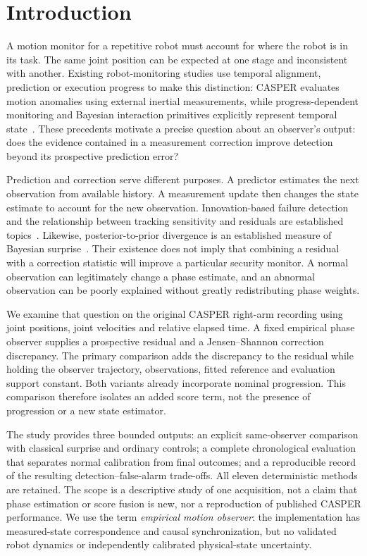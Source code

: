 \section{Introduction}
\label{sec:intro}
A motion monitor for a repetitive robot must account for where the robot is in its task. The same joint position can be expected at one stage and inconsistent with another. Existing robot-monitoring studies use temporal alignment, prediction or execution progress to make this distinction: CASPER evaluates motion anomalies using external inertial measurements, while progress-dependent monitoring and Bayesian interaction primitives explicitly represent temporal state~\cite{casper2024,park2016,campbell2017}. These precedents motivate a precise question about an observer's output: does the evidence contained in a measurement correction improve detection beyond its prospective prediction error?

Prediction and correction serve different purposes. A predictor estimates the next observation from available history. A measurement update then changes the state estimate to account for the new observation. Innovation-based failure detection and the relationship between tracking sensitivity and residuals are established topics~\cite{willsky1976}. Likewise, posterior-to-prior divergence is an established measure of Bayesian surprise~\cite{itti2005}. Their existence does not imply that combining a residual with a correction statistic will improve a particular security monitor. A normal observation can legitimately change a phase estimate, and an abnormal observation can be poorly explained without greatly redistributing phase weights.

We examine that question on the original CASPER right-arm recording using joint positions, joint velocities and relative elapsed time. A fixed empirical phase observer supplies a prospective residual and a Jensen--Shannon correction discrepancy. The primary comparison adds the discrepancy to the residual while holding the observer trajectory, observations, fitted reference and evaluation support constant. Both variants already incorporate nominal progression. This comparison therefore isolates an added score term, not the presence of progression or a new state estimator.

The study provides three bounded outputs: an explicit same-observer comparison with classical surprise and ordinary controls; a complete chronological evaluation that separates normal calibration from final outcomes; and a reproducible record of the resulting detection--false-alarm trade-offs. All eleven deterministic methods are retained. The scope is a descriptive study of one acquisition, not a claim that phase estimation or score fusion is new, nor a reproduction of published CASPER performance. We use the term \emph{empirical motion observer}: the implementation has measured-state correspondence and causal synchronization, but no validated robot dynamics or independently calibrated physical-state uncertainty.

